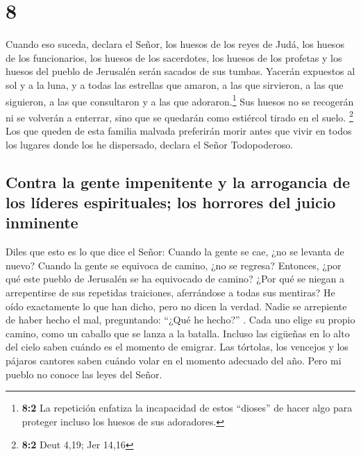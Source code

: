 \hypertarget{section-7}{%
\section{8}\label{section-7}}

 Cuando eso suceda, declara el Señor, los huesos de los
reyes de Judá, los huesos de los funcionarios, los huesos de los
sacerdotes, los huesos de los profetas y los huesos del pueblo de
Jerusalén serán sacados de sus tumbas.  Yacerán expuestos
al sol y a la luna, y a todas las estrellas que amaron, a las que
sirvieron, a las que siguieron, a las que consultaron y a las que
adoraron.\footnote{\textbf{8:2} La repetición enfatiza la incapacidad de
  estos ``dioses'' de hacer algo para proteger incluso los huesos de sus
  adoradores.} Sus huesos no se recogerán ni se volverán a enterrar,
sino que se quedarán como estiércol tirado en el suelo. \footnote{\textbf{8:2}
  Deut 4,19; Jer 14,16}  Los que queden de esta familia
malvada preferirán morir antes que vivir en todos los lugares donde los
he dispersado, declara el Señor Todopoderoso.

\hypertarget{contra-la-gente-impenitente-y-la-arrogancia-de-los-luxedderes-espirituales-los-horrores-del-juicio-inminente}{%
\subsection{Contra la gente impenitente y la arrogancia de los líderes
espirituales; los horrores del juicio
inminente}\label{contra-la-gente-impenitente-y-la-arrogancia-de-los-luxedderes-espirituales-los-horrores-del-juicio-inminente}}

 Diles que esto es lo que dice el Señor: Cuando la gente
se cae, ¿no se levanta de nuevo? Cuando la gente se equivoca de camino,
¿no se regresa?  Entonces, ¿por qué este pueblo de
Jerusalén se ha equivocado de camino? ¿Por qué se niegan a arrepentirse
de sus repetidas traiciones, aferrándose a todas sus mentiras?
 He oído exactamente lo que han dicho, pero no dicen la
verdad. Nadie se arrepiente de haber hecho el mal, preguntando: ``¿Qué
he hecho?'' . Cada uno elige su propio camino, como un caballo que se
lanza a la batalla.  Incluso las cigüeñas en lo alto del
cielo saben cuándo es el momento de emigrar. Las tórtolas, los vencejos
y los pájaros cantores saben cuándo volar en el momento adecuado del
año. Pero mi pueblo no conoce las leyes del Señor.

